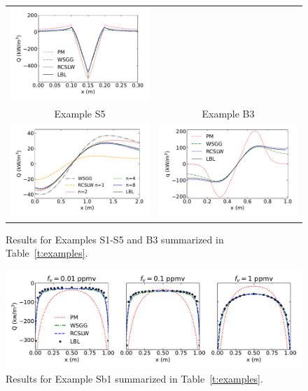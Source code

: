 \documentclass[preprint,12pt]{elsarticle}
\begin{document}
\begin{figure}
\begin{center}
\begin{tabular}{c c}
        \includegraphics[width=2.75 in]{fig_ex_S4a.pdf} \\
        Example S5 & Example B3 \\
        \includegraphics[width=2.75 in]{fig_ex_S5c.pdf} &
        \includegraphics[width=2.75 in]{fig_ex_B3.pdf}
    \end{tabular}
    \caption{Results for Examples S1-S5 and B3 summarized in Table~\ref{t:examples}.}
    \label{f:examples}
    \end{center}
\end{figure}
%
\begin{figure}
    \begin{center}
        \includegraphics[width=5.5 in]{fig_ex_Sb1.pdf}
    \caption{Results for Example Sb1 summarized in Table~\ref{t:examples}.}
    \label{f:exSb1}
    \end{center}
\end{figure}
%
\end{document}

